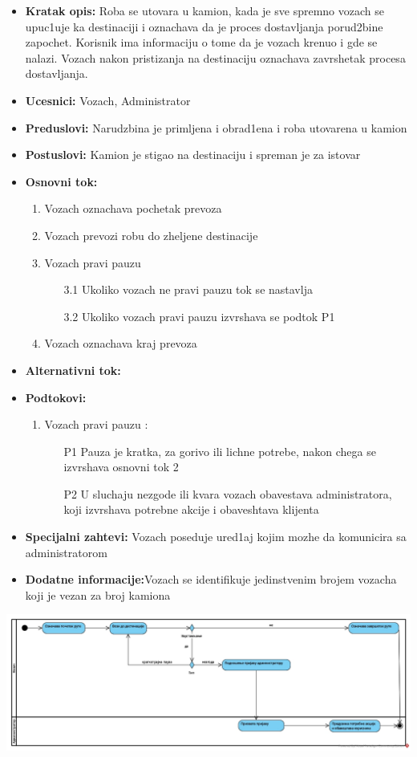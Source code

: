  \begin{itemize}
	\item {\textbf{Kratak opis:} Roba se utovara u kamion, kada je sve spremno vozach se upuc1uje ka destinaciji i oznachava da je proces dostavljanja porud2bine zapochet. Korisnik ima informaciju o tome da je vozach krenuo i gde se nalazi. Vozach nakon pristizanja na destinaciju oznachava zavrshetak procesa
		dostavljanja. }
	\item{\textbf{Ucesnici:} Vozach, Administrator}
	\item{\textbf{Preduslovi:} Narudzbina je primljena i obrad1ena  i roba  utovarena u kamion}
	\item{\textbf{Postuslovi:} Kamion je  stigao na destinaciju i spreman je za istovar}
	\item{\textbf{Osnovni tok:}  \begin{enumerate}
				\item {Vozach oznachava pochetak prevoza}
				\item {Vozach prevozi robu do zheljene destinacije}
				\item{Vozach pravi pauzu \begin{itemize} 
						\item [3.1]{Ukoliko vozach ne pravi pauzu tok se nastavlja }
						\item[3.2]{Ukoliko vozach pravi pauzu izvrshava se podtok P{1}}
				\end{itemize}
			}
				\item {Vozach oznachava kraj prevoza}
	\end{enumerate}}
\item{\textbf{Alternativni tok:} }

\item{\textbf{Podtokovi:}
		\begin{enumerate}
		\item {Vozach pravi pauzu : \begin{itemize}
					\item [P{1}]{Pauza je kratka, za gorivo ili lichne potrebe, nakon chega se izvrshava osnovni tok 2} 
					\item[P{2}]{U sluchaju nezgode ili kvara vozach obavestava administratora, koji izvrshava potrebne akcije i obaveshtava klijenta}
					\end{itemize}}
	\end{enumerate}}
\item{\textbf{Specijalni zahtevi:} Vozach poseduje ured1aj kojim mozhe da komunicira sa administratorom}
\item{\textbf{Dodatne informacije:}Vozach se identifikuje jedinstvenim brojem vozacha koji je vezan za broj kamiona}
\end{itemize}
\includegraphics{Slike/SUdostavljanjePorudzbine}




